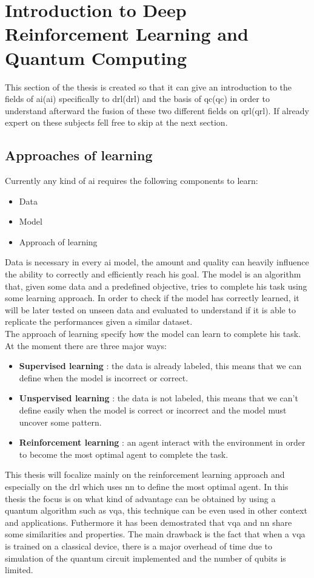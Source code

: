 \section{Introduction to Deep Reinforcement Learning and Quantum Computing}
This section of the thesis is created so that it can give an introduction to the fields of \acrlong{ai}(\acrshort{ai}) specifically to \acrlong{drl}(\acrshort{drl}) and the basis of \acrlong{qc}(\acrshort{qc}) in order to understand afterward the fusion of these two different fields on \acrlong{qrl}(\acrshort{qrl}). If already expert on these subjects fell free to skip at the next section.
\subsection{Approaches of learning}
Currently any kind of \acrshort{ai} requires the following components to learn:
\begin{itemize}
	\item Data
	\item Model
	\item Approach of learning
\end{itemize}
Data is necessary in every \acrshort{ai} model, the amount and quality can heavily influence the ability to correctly and efficiently reach his goal. 
The model is an algorithm that, given some data and a predefined objective, tries to complete his task using some learning approach. In order to check if the model has correctly learned, it will be later tested on unseen data and evaluated to understand if it is able to replicate the performances given a similar dataset.\\
The approach of learning specify how the model can learn to complete his task. At the moment there are three major ways:
\begin{itemize}
	\item \textbf{Supervised learning} : the data is already labeled, this means that we can define when the model is incorrect or correct.
	\item \textbf{Unspervised learning} : the data is not labeled, this means that we can't define easily when the model is correct or incorrect and the model must uncover some pattern.
	\item \textbf{Reinforcement learning} : an agent interact with the environment in order to become the most optimal agent to complete the task.
\end{itemize}
This thesis will focalize mainly on the reinforcement learning approach and especially on the \acrfull{drl} which uses \acrfull{nn} to define the most optimal agent.
In this thesis the focus is on what kind of advantage can be obtained by using a quantum algorithm such as \acrfull{vqa}, this technique can be even used in other context and applications. Futhermore it has been demostrated that \acrshort{vqa} and \acrshort{nn} share some similarities and properties. The main drawback is the fact that when a \acrshort{vqa} is trained on a classical device, there is a major overhead of time due to simulation of the quantum circuit implemented and the number of qubits is limited.
